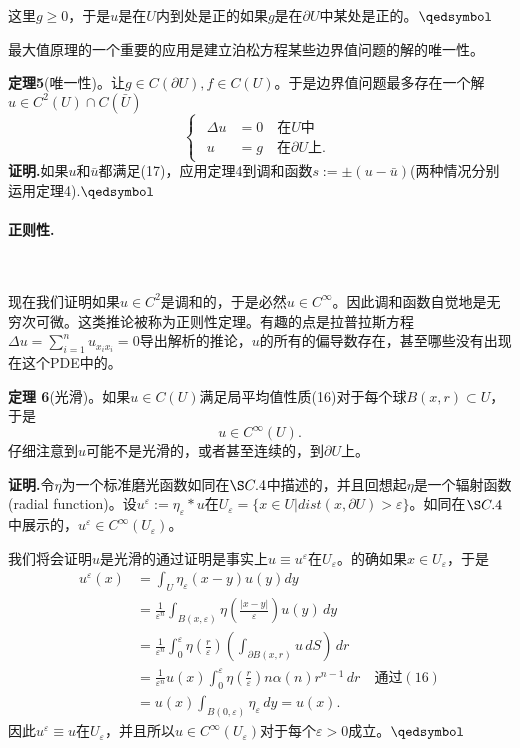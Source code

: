 \documentclass[leqno]{article}
\numberwithin{equation}{subsection}%
\begin{document}
这里$g\geq 0$，于是$u$是在$U$内到处是正的如果$g$是在$\partial U$中某处是正的。$\hfill\qedsymbol$
\par
最大值原理的一个重要的应用是建立泊松方程某些边界值问题的解的唯一性。
\par
\noindent\textbf{定理5}(唯一性)。让$g\in C(\partial U),f\in C(U)$。于是边界值问题最多存在一个解$u\in C^{2}(U)\cap C(\bar{U})$
\begin{equation}
\begin{cases}
\begin{aligned}
\Delta u&=0 \quad \text{在}U\text{中}\\
u&=g \quad \text{在} \partial U\text{上}.
\end{aligned}
\end{cases}
\end{equation}
\textbf{证明.}如果$u$和$\bar{u}$都满足(17)，应用定理4到调和函数$s:=\pm(u-\bar{u})$(两种情况分别运用定理4).$\hfill\qedsymbol$

\paragraph{正则性.}~{}
\par
现在我们证明如果$u\in C^{2}$是调和的，于是必然$u\in C^{\infty}$。因此调和函数自觉地是无穷次可微。这类推论被称为正则性定理。有趣的点是拉普拉斯方程$\Delta u=\sum_{i=1}^{n}u_{x_{i}x_{i}}=0$导出解析的推论，$u$的所有的偏导数存在，甚至哪些没有出现在这个PDE中的。
\par
\noindent\textbf{定理 6}(光滑)。如果$u\in C(U)$满足局平均值性质(16)对于每个球$B(x,r)\subset U$，于是
\begin{equation*}
u\in C^{\infty}(U).
\end{equation*}
仔细注意到$u$可能不是光滑的，或者甚至连续的，到$\partial U$上。
\par
\noindent\textbf{证明.}令$\eta$为一个标准磨光函数如同在$\S C.4$中描述的，并且回想起$\eta$是一个辐射函数(radial function)。设$u^{\varepsilon}:=\eta_{\varepsilon}*u$在$U_{\varepsilon}=\{x\in U|dist(x,\partial U)>\varepsilon\}$。如同在$\S C.4$中展示的，$u^{\varepsilon}\in C^{\infty}(U_{\varepsilon})$。
\par
我们将会证明$u$是光滑的通过证明是事实上$u\equiv u^{\varepsilon}$在$U_{\varepsilon}$。的确如果$x\in U_{\varepsilon}$，于是
\begin{equation*}
\begin{aligned}
u^{\varepsilon}(x)&=\int_{U}\eta_{\varepsilon}(x-y)u(y)dy\\
&=\frac{1}{\varepsilon^{n}}\int_{B(x,\varepsilon)}\eta\left(\frac{|x-y|}{\varepsilon}\right)u(y)\,dy\\
&=\frac{1}{\varepsilon^{n}}\int_{0}^{\varepsilon}\eta\left(\frac{r}{\varepsilon}\right)\left(\int_{\partial B(x,r)}u\,dS\right)\,dr\\
&=\frac{1}{\varepsilon^{n}}u(x)\int_{0}^{\varepsilon}\eta\left(\frac{r}{\varepsilon}\right)n\alpha(n)r^{n-1}\,dr \quad \text{通过}(16)\\
&=u(x)\int_{B(0,\varepsilon)}\eta_{\varepsilon}\,dy=u(x).
\end{aligned}
\end{equation*}
因此$u^{\varepsilon}\equiv u$在$U_{\varepsilon}$，并且所以$u\in C^{\infty}(U_{\varepsilon})$对于每个$\varepsilon>0$成立。$\hfill\qedsymbol$
\end{document}
